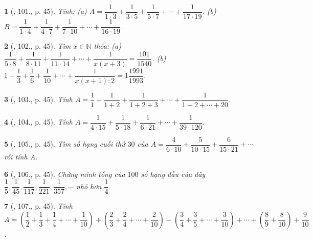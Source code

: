 \documentclass{article}
\newtheorem{baitoan}{}
\begin{document}
\begin{baitoan}[\cite{Binh_Toan_6_tap_2}, 101., p. 45]
	Tính: (a) $A = \dfrac{1}{1\cdot3} + \dfrac{1}{3\cdot5} + \dfrac{1}{5\cdot7} + \cdots + \dfrac{1}{17\cdot19}$. (b) $B = \dfrac{1}{1\cdot4} + \dfrac{1}{4\cdot7} + \dfrac{1}{7\cdot10} + \cdots + \dfrac{1}{16\cdot19}$.
\end{baitoan}

\begin{baitoan}[\cite{Binh_Toan_6_tap_2}, 102., p. 45]
	Tìm $x\in\mathbb{N}$ thỏa: (a) $\dfrac{1}{5\cdot8} + \dfrac{1}{8\cdot11} + \dfrac{1}{11\cdot14} + \cdots + \dfrac{1}{x(x + 3)} = \dfrac{101}{1540}$. (b) $1 + \dfrac{1}{3} + \dfrac{1}{6} + \dfrac{1}{10} + \cdots + \dfrac{1}{x(x + 1):2} = 1\dfrac{1991}{1993}$.
\end{baitoan}

\begin{baitoan}[\cite{Binh_Toan_6_tap_2}, 103., p. 45]
	Tính $A = \dfrac{1}{1} + \dfrac{1}{1 + 2} + \dfrac{1}{1 + 2 + 3} + \cdots + \dfrac{1}{1 + 2 + \cdots + 20}$.
\end{baitoan}

\begin{baitoan}[\cite{Binh_Toan_6_tap_2}, 104., p. 45]
	Tính $A = \dfrac{1}{4\cdot15} + \dfrac{1}{5\cdot18} + \dfrac{1}{6\cdot21} + \cdots + \dfrac{1}{39\cdot120}$.
\end{baitoan}

\begin{baitoan}[\cite{Binh_Toan_6_tap_2}, 105., p. 45]
	Tìm số hạng cuối thứ $30$ của $A = \dfrac{4}{6\cdot10} + \dfrac{5}{10\cdot15} + \dfrac{6}{15\cdot21} + \cdots$ rồi tính A.
\end{baitoan}

\begin{baitoan}[\cite{Binh_Toan_6_tap_2}, 106., p. 45]
	Chứng minh tổng của $100$ số hạng đầu của dãy $\dfrac{1}{5},\dfrac{1}{45},\dfrac{1}{117},\dfrac{1}{221},\dfrac{1}{357},\cdots$ nhỏ hơn $\dfrac{1}{4}$.
\end{baitoan}

\begin{baitoan}[\cite{Binh_Toan_6_tap_2}, 107., p. 45]
	Tính $A = \left(\dfrac{1}{2} + \dfrac{1}{3} + \dfrac{1}{4} + \cdots + \dfrac{1}{10}\right) + \left(\dfrac{2}{3} + \dfrac{2}{4} + \cdots + \dfrac{2}{10}\right) + \left(\dfrac{3}{4} + \dfrac{3}{5} + \cdots + \dfrac{3}{10}\right) + \cdots + \left(\dfrac{8}{9} + \dfrac{8}{10}\right) + \dfrac{9}{10}$.
\end{baitoan}
\end{document}
